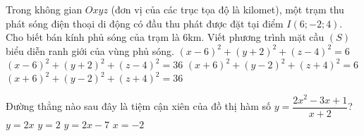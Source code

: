\begin{ex}%
	Trong không gian $Oxyz$ (đơn vị của các trục tọa độ là kilomet), một trạm thu phát sóng điện thoại di động có đầu thu phát được đặt tại điểm $I(6;-2;4)$. Cho biết bán kính phủ sóng của trạm là $6$km. Viết phương trình mặt cầu $(S)$ biểu diễn ranh giới của vùng phủ sóng.
	\choice
	{$(x-6)^2+(y+2)^2+(z-4)^2=6$}
	{\True $(x-6)^2+(y+2)^2+(z-4)^2=36$}
	{$(x+6)^2+(y-2)^2+(z+4)^2=6$}
	{$(x+6)^2+(y-2)^2+(z+4)^2=36$}
\end{ex}

\begin{ex}%
	Đường thẳng nào sau đây là tiệm cận xiên của đồ thị hàm số $y=\dfrac{2x^2-3x+1}{x+2}$?
	\choice
	{$y=2x$}
	{$y=2$}
	{\True $y=2x-7$}
	{$x=-2$}
\end{ex}

